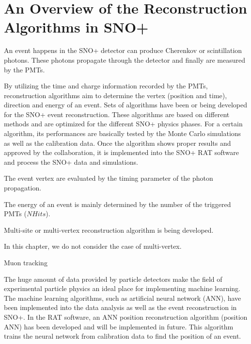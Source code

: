 \section{An Overview of the Reconstruction Algorithms in SNO+}
An event happens in the SNO+ detector can produce Cherenkov or scintillation photons. These photons propagate through the detector and finally are measured by the PMTs.

By utilizing the time and charge information recorded by the PMTs, reconstruction algorithms aim to determine the vertex (position and time), direction and energy of an event. Sets of algorithms have been or being developed for the SNO+ event reconstruction. These algorithms are based on different methods and are optimized for the different SNO+ physics phases. For a certain algorithm, its performances are basically tested by the Monte Carlo simulations as well as the calibration data. Once the algorithm shows proper results and approved by the collaboration, it is implemented into the SNO+ RAT software and process the SNO+ data and simulations.

The event vertex are evaluated by the timing parameter of the photon propagation. 

The energy of an event is mainly determined by the number of the triggered PMTs ($NHits$). 

Multi-site or multi-vertex reconstruction algorithm is being developed.

In this chapter, we do not consider the case of multi-vertex.




Muon tracking


The huge amount of data provided by particle detectors make the field of experimental particle physics an ideal place for implementing machine learning. The machine learning algorithms, such as artificial neural network (ANN), have been implemented into the data analysis as well as the event reconstruction in SNO+. In the RAT software, an ANN position reconstruction algorithm (position ANN) has been developed and will be implemented in future. This algorithm trains the neural network from calibration data to find the position of an event.

